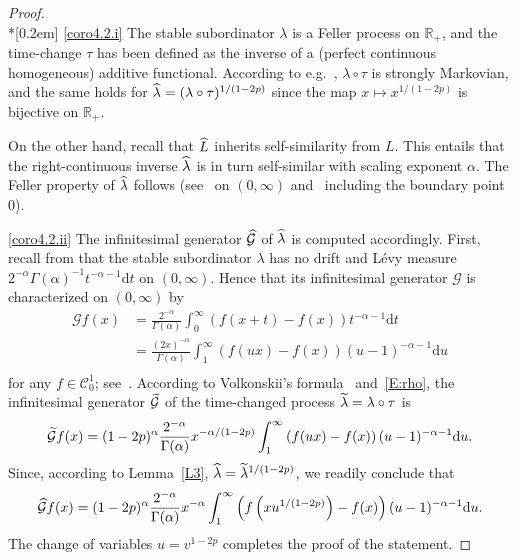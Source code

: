 \documentclass[AHL,Unicode,longabstracts,published]{cedram}
\renewcommand{\tilde}[1]{\widetilde{#1}}
\renewcommand{\hat}[1]{\widehat{#1}}
\newcommand{\dd}{\mathrm{d}}
\newcommand{\R}{\mathbb{R}}
\newcommand{\calC}{\mathcal{C}}
\newcommand{\calG}{\mathcal{G}}
\let\oldtilde\tilde
\renewcommand*{\tilde}[1]{\mathchoice{\widetilde{#1}}{\widetilde{#1}}{\oldtilde{#1}}{\oldtilde{#1}}}
\let\oldhat\hat
\renewcommand*{\hat}[1]{\mathchoice{\widehat{#1}}{\widehat{#1}}{\oldhat{#1}}{\oldhat{#1}}}
\begin{document}
\begin{proof}\ \\*[0.2em]
\eqref{coro4.2.i} The stable subordinator $\lambda$ is a Feller process on $\R_+$, and the time-change $\tau$ has been defined as the inverse of a (perfect continuous homogeneous) additive functional. According to e.g.~\cite[Section~III.21]{WillRo}, $\lambda\circ \tau$ is strongly Markovian, and the same holds for $\hat \lambda=(\lambda\circ \tau)^{1/(1-2p)}$ since the map $x\mapsto x^{1/(1-2p)}$ is bijective on $\R_+$.

On the other hand, recall that $\hat{L}$ inherits self-similarity from ${L}$. This entails that the right-continuous inverse $\hat \lambda$ is in turn self-similar with scaling exponent $\alpha$. The Feller property of $\hat \lambda$ follows (see~\cite[Theorem~2.1]{Lamperti} on $(0,\infty)$ and~\cite[Theorem~1]{BY} including the boundary point $0$).


\noindent\eqref{coro4.2.ii} The infinitesimal generator $\hat{\calG}$ of $\hat \lambda$ is computed accordingly. First, recall from \cite[Proposition~3.2]{DRVY} that the stable subordinator $\lambda$ has no drift and Lévy measure $2^{-\alpha} \Gamma(\alpha)^{-1} t^{-\alpha - 1} \dd t $ on $(0,\infty)$. Hence that its infinitesimal generator ${\calG}$ is characterized on $(0,\infty)$ by
\begin{align*}
{\calG}f(x) &= \frac{2^{-\alpha}}{\Gamma(\alpha)}\int_0^{\infty} \left(f(x+t)-f(x)\right) t^{-\alpha - 1} \dd t \\
&= \frac{(2x)^{-\alpha}}{\Gamma(\alpha)}\int_1^{\infty} \left(f(ux)-f(x)\right) (u-1)^{-\alpha - 1} \dd u \\
\end{align*}
for any $f\in \calC^1_0$; see~\cite[Theorem~31.5 on page 208]{Sato}. According to Volkonskii's formula~\cite[III.21.4, p.~277]{WillRo} and~\eqref{E:rho}, the infinitesimal generator $\tilde {\calG}$ of the time-changed process $\tilde \lambda=\lambda \circ \tau$ is
\[
\tilde {\calG}f(x) = (1-2p)^{\alpha} \frac{2^{-\alpha}}{\Gamma(\alpha)} x^{-\alpha /(1-2p)} \int_1^{\infty} \left(f(ux)-f(x)\right) (u-1)^{-\alpha - 1} \dd u.
\]
Since, according to Lemma~\ref{L3}, $\hat \lambda =\tilde \lambda^{1/(1-2p)}$, we readily conclude that
\[
\hat{\calG}f(x) = (1-2p)^{\alpha} \frac{2^{-\alpha}}{\Gamma(\alpha)} x^{-\alpha} \int_1^{\infty} \left(f\left(x u^{1/(1-2p)}\right)-f(x)\right) (u-1)^{-\alpha - 1} \dd u.
\]
The change of variables $u=v^{1-2p}$ completes the proof of the statement.
\end{proof}
\end{document}
